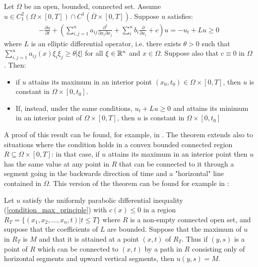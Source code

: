 \begin{theorem}\label{maximum_principle}
	Let $\Omega$ be an open, bounded, connected set. Assume $u\in C^2_1(\Omega\times [0, T])\cap C^1(\overline{\Omega}\times [0, T])$. Suppose $u$ satisfies: 
	\begin{align}
		-\frac{\partial u}{\partial t} + \left(\sum_{i, j=1}^n a_{ij}\frac{\partial^2 }{\partial x_i\partial x_j}+\sum_{i}^n b_{i}\frac{\partial }{\partial x_i} + c\right)  u = -u_t + Lu \geq 0 \label{condition_max_principle}
	\end{align}
	where $L$ is an elliptic differential operator, i.e. there exists $\theta>0$ such that $\sum_{i,j=1}^{n} a_{ij}(x) \xi_i\xi_j \geq \theta |\xi |$ for all $\xi \in \mathbb{R}^n$ and $x \in \Omega$. Suppose also that $c\equiv 0$ in $\Omega$. Then:\label{maxprinc} \begin{itemize}
		\item if $u$ attains its maximum in an interior point $(x_0, t_0)\in\Omega\times [0, T]$, then $u$ is constant in $\Omega\times [0, t_0]$.
		\item If, instead, under the same conditions, $u_t+ Lu \geq 0$ and attains its minimum in an interior point of $\Omega\times [0, T]$, then $u$ is constant in $\Omega\times [0, t_0]$
	\end{itemize}
\end{theorem}
A proof of this result can be found, for example, in \cite{Evans}. The theorem extends also to situations where the condition holds in a convex bounded connected region $R\subseteq \Omega \times [0, T]$: in that case, if $u$ attains its maximum in an interior point then $u$ has the same value at any point in $R$ that can be connected to it through a segment going in the backwards direction of time and a "horizontal" line contained in $\Omega$. This version of the theorem can be found for example in \cite{protterweinberger}: 
\begin{theorem}
	Let $u$ satisfy the uniformly parabolic differential inequality (\ref{condition_max_principle}) with $c(x)\leq 0$
	in a region $R_T =\{(x_1,x_2, \dots ,x_n ,t)\vert t\leq T\}$ where $R$ is a non-empty connected open set, and suppose that the coefficients of $L$ are bounded. Suppose that the maximum of $u$ in $R_T$ is $M$ and that it is attained at a point $(x, t)$ of $R_T$. Thus if $(y,s)$ is a point of $R$ which can be connected to $(x,t)$ by a path in $R$ consisting only of horizontal segments and upward vertical segments, then $u(y,s) = M$.\label{maxprincprotterweinberger}
\end{theorem}

